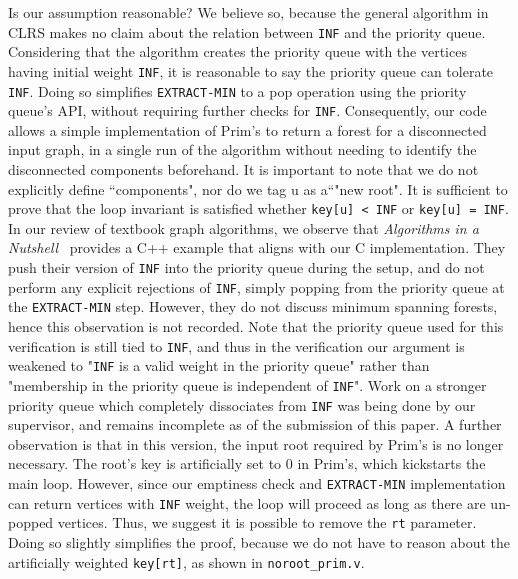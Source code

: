 Is our assumption reasonable? We believe so, because the general algorithm in CLRS makes no claim about the relation between \texttt{INF} and the priority queue. Considering that the algorithm creates the priority queue with the vertices having initial weight \texttt{INF}, it is reasonable to say the priority queue can tolerate \texttt{INF}. Doing so simplifies \texttt{EXTRACT-MIN} to a pop operation using the priority queue's API, without requiring further checks for \texttt{INF}.
\newline\newline
Consequently, our code allows a simple implementation of Prim's to return a forest for a disconnected input graph, in a single run of the algorithm without needing to identify the disconnected components beforehand. It is important to note that we do not explicitly define ``components", nor do we tag u as a``"new root". It is sufficient to prove that the loop invariant is satisfied whether \texttt{key[u] < INF} or \texttt{key[u] = INF}.
\newline\newline
In our review of textbook graph algorithms, we observe that \textit{Algorithms in a Nutshell}~\cite{heineman2008algorithms} provides a C++ example that aligns with our C implementation. They push their version of \texttt{INF} into the priority queue during the setup, and do not perform any explicit rejections of \texttt{INF}, simply popping from the priority queue at the \texttt{EXTRACT-MIN} step. However, they do not discuss minimum spanning forests, hence this observation is not recorded.
\newline\newline
Note that the priority queue used for this verification is still tied to \texttt{INF}, and thus in the verification our argument is weakened to "\texttt{INF} is a valid weight in the priority queue" rather than "membership in the priority queue is independent of \texttt{INF}". Work on a stronger priority queue which completely dissociates from \texttt{INF} was being done by our supervisor, and remains incomplete as of the submission of this paper.
\newline\newline
A further observation is that in this version, the input root required by Prim's is no longer necessary. The root's key is artificially set to 0 in Prim's, which kickstarts the main loop. However, since our emptiness check and \texttt{EXTRACT-MIN} implementation can return vertices with \texttt{INF} weight, the loop will proceed as long as there are un-popped vertices. Thus, we suggest it is possible to remove the \texttt{rt} parameter. Doing so slightly simplifies the proof, because we do not have to reason about the artificially weighted \texttt{key[rt]}, as shown in \texttt{noroot\_prim.v}.

